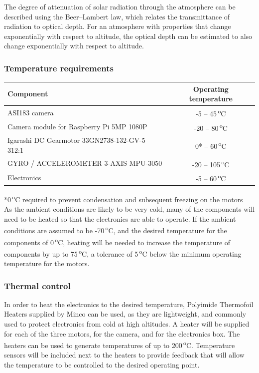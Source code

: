 The degree of attenuation of solar radiation through the atmosphere can be described using the Beer–Lambert law, which relates the transmittance of radiation to optical depth. For an atmosphere with properties that change exponentially with respect to altitude, the optical depth can be estimated to also change exponentially with respect to altitude. \


\subsubsection{Temperature requirements}

\begin{center}
  \begin{tabular}{ | l | c | }
    \hline
    \textbf{Component} & \textbf{Operating temperature} \\ \hline
    ASI183 camera  & -5 – 45\,\textsuperscript{o}C \\ \hline
    Camera module for Raspberry Pi 5MP 1080P & -20 – 80\,\textsuperscript{o}C \\ \hline
    Igarashi DC Gearmotor 33GN2738-132-GV-5 312:1  & 0* – 60\,\textsuperscript{o}C \\ \hline
    GYRO / ACCELEROMETER 3-AXIS  MPU-3050 & -20 – 105\,\textsuperscript{o}C \\ \hline 
    Electronics  & -5 – 60\,\textsuperscript{o}C \\ \hline
  \end{tabular}
\end{center}

*0\,\textsuperscript{o}C required to prevent condensation and subsequent freezing on the motors\\

As the ambient conditions are likely to be very cold, many of the components will need to be heated so that the electronics are able to operate. If the ambient conditions are assumed to be -70\,\textsuperscript{o}C, and the desired temperature for the components of 0\,\textsuperscript{o}C, heating will be needed to increase the temperature of components by up to  75\,\textsuperscript{o}C, a tolerance of 5\,\textsuperscript{o}C below the minimum operating temperature for the motors.\

\subsubsection{Thermal control}
In order to heat the electronics to the desired temperature, Polyimide Thermofoil Heaters supplied by Minco can be used, as they are lightweight, and commonly used to protect electronics from cold at high altitudes. A heater will be supplied for each of the three motors, for the camera, and for the electronics box. The heaters can be used to generate temperatures of up to 200\,\textsuperscript{o}C. Temperature sensors will be included next to the heaters to provide feedback that will allow the temperature to be controlled to the desired operating point. \\

